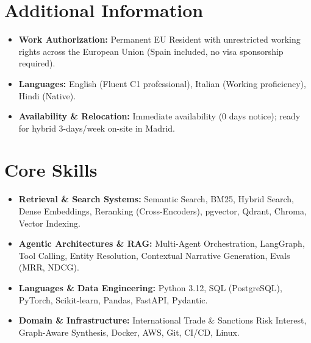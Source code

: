 \documentclass[a4paper,10pt]{article}
\begin{document}
\section{Additional Information}
\begin{itemize}
  \item \textbf{Work Authorization:} Permanent EU Resident with unrestricted working rights across the European Union (Spain included, no visa sponsorship required).
  \item \textbf{Languages:} English (Fluent C1 professional), Italian (Working proficiency), Hindi (Native).
  \item \textbf{Availability \& Relocation:} Immediate availability (0 days notice); ready for hybrid 3-days/week on-site in Madrid.
\end{itemize}

\section{Core Skills}
\begin{itemize}
  \item \textbf{Retrieval \& Search Systems:} Semantic Search, BM25, Hybrid Search, Dense Embeddings, Reranking (Cross-Encoders), pgvector, Qdrant, Chroma, Vector Indexing.
  \item \textbf{Agentic Architectures \& RAG:} Multi-Agent Orchestration, LangGraph, Tool Calling, Entity Resolution, Contextual Narrative Generation, Evals (MRR, NDCG).
  \item \textbf{Languages \& Data Engineering:} Python 3.12, SQL (PostgreSQL), PyTorch, Scikit-learn, Pandas, FastAPI, Pydantic.
  \item \textbf{Domain \& Infrastructure:} International Trade \& Sanctions Risk Interest, Graph-Aware Synthesis, Docker, AWS, Git, CI/CD, Linux.
\end{itemize}
\end{document}
